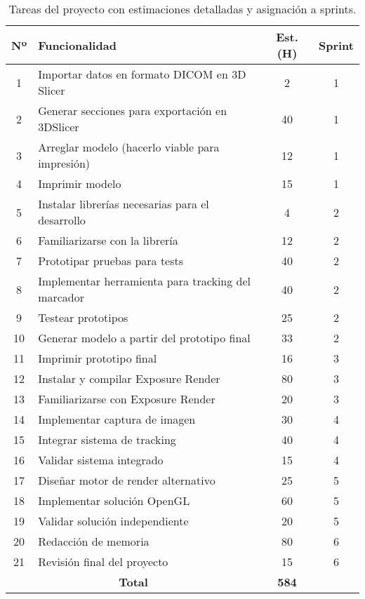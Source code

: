 \begin{table}
  \centering
  \begin{tabular}{|c|p{7.5cm}|c|c|}
  \hline
  \rowcolor{udcpink!25}
  \textbf{Nº} & \textbf{Funcionalidad} & \textbf{Est. (H)} & \textbf{Sprint} \\\hline
  1     &   Importar datos en formato DICOM en 3D Slicer    &   2     & 1 \\
  2     &   Generar secciones para exportación en 3DSlicer &   40    & 1 \\
  3     &   Arreglar modelo (hacerlo viable para impresión) &   12    & 1 \\
  4     &   Imprimir modelo                                  &   15    & 1 \\
  5     &   Instalar librerías necesarias para el desarrollo &   4     & 2 \\
  6     &   Familiarizarse con la librería                   &   12    & 2 \\
  7     &   Prototipar pruebas para tests                    &   40    & 2 \\
  8     &   Implementar herramienta para tracking del marcador &   40    & 2 \\  
  9     &   Testear prototipos                               &   25    & 2 \\
  10    &   Generar modelo a partir del prototipo final      &   33    & 2 \\
  11    &   Imprimir prototipo final                         &   16    & 3 \\
  12    &   Instalar y compilar Exposure Render              &   80    & 3 \\
  13    &   Familiarizarse con Exposure Render               &   20    & 3 \\
  14    &   Implementar captura de imagen                    &   30    & 4 \\
  15    &   Integrar sistema de tracking                     &   40    & 4 \\
  16    &   Validar sistema integrado                        &   15    & 4 \\
  17    &   Diseñar motor de render alternativo              &   25    & 5 \\
  18    &   Implementar solución OpenGL                      &   60    & 5 \\
  19    &   Validar solución independiente                   &   20    & 5 \\
  20    &   Redacción de memoria                             &   80    & 6 \\
  21    &   Revisión final del proyecto                      &   15    & 6 \\
  \hline
  \multicolumn{2}{|c|}{\textbf{Total}} & \textbf{584} & \\
  \hline
  \end{tabular}
  \caption{Tareas del proyecto con estimaciones detalladas y asignación a sprints.}
  \label{tab:tareas_completa}
\end{table}

